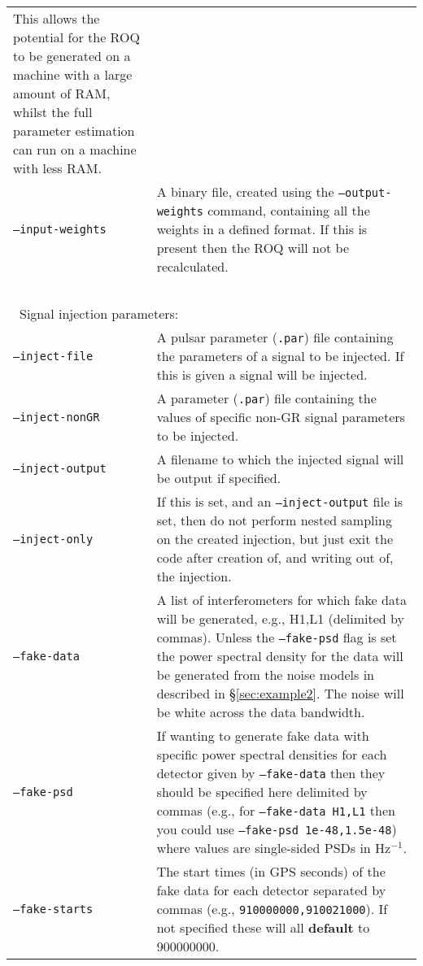 \begin{footnotesize}
\begin{longtable}{|p{}p{}|}
                            This allows the potential for the ROQ to be generated on a machine with a large amount of RAM, whilst the full parameter
                            estimation can run on a machine with less RAM. \\
 {\tt --input-weights}   &  A binary file, created using the {\tt --output-weights} command, containing all the weights in a defined format.
                            If this is present then the ROQ will not be recalculated. \\
 ~ & ~ \\
\multicolumn{2}{|l|}{~Signal injection parameters:} \\
 {\tt --inject-file}     &  A pulsar parameter ({\tt .par}) file containing the parameters of a signal to be injected. If this is
                           given a signal will be injected. \\
 {\tt --inject-nonGR}    &  A parameter ({\tt .par}) file containing the values of specific non-GR signal parameters to be injected. \\
 {\tt --inject-output}   &  A filename to which the injected signal will be output if specified. \\
 {\tt --inject-only}     &  If this is set, and an {\tt --inject-output} file is set, then do not perform nested sampling on the
                            created injection, but just exit the code after creation of, and writing out of, the injection. \\
 {\tt --fake-data}       &  A list of interferometers for which fake data will be generated, e.g., H1,L1 (delimited by commas). Unless
                            the {\tt --fake-psd} flag is set the power spectral density for the data will be generated from the
                            noise models in described in \S\ref{sec:example2}. The noise will be white across the data bandwidth. \\
 {\tt --fake-psd}        &  If wanting to generate fake data with specific power spectral densities for each detector given
                            by {\tt --fake-data} then they should be specified here delimited by commas (e.g., for {\tt --fake-data H1,L1}
                            then you could use {\tt --fake-psd 1e-48,1.5e-48}) where values are single-sided PSDs in Hz$^{-1}$. \\
 {\tt --fake-starts}     &  The start times (in GPS seconds) of the fake data for each detector separated by commas (e.g.,
                            {\tt 910000000,910021000}). If not specified these will all {\bf default} to 900000000. \\

\end{longtable}
\end{footnotesize}
